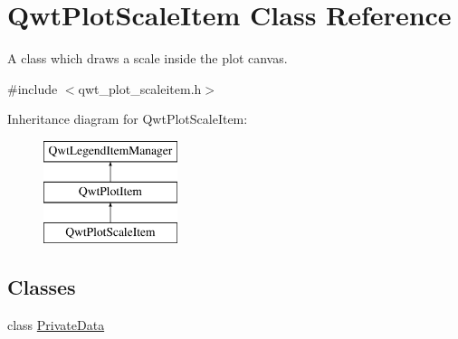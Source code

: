 \hypertarget{class_qwt_plot_scale_item}{\section{Qwt\-Plot\-Scale\-Item Class Reference}
\label{class_qwt_plot_scale_item}
}


A class which draws a scale inside the plot canvas.  




{\ttfamily \#include $<$qwt\-\_\-plot\-\_\-scaleitem.\-h$>$}

Inheritance diagram for Qwt\-Plot\-Scale\-Item\-:\begin{figure}[H]
\begin{center}
\leavevmode
\includegraphics[height=3.000000cm]{class_qwt_plot_scale_item}
\end{center}
\end{figure}
\subsection*{Classes}
\begin{DoxyCompactItemize}
\item 
class \hyperlink{class_qwt_plot_scale_item_1_1_private_data}{Private\-Data}
\end{DoxyCompactItemize}
